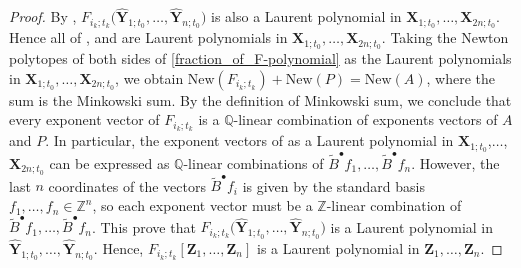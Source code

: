 \begin{proof}
 By \cite[Theorem 3.1]{BCDX2023}, $F_{i_{k};t_{k}}\bigl(\mathbf{\hat{Y}}_{1;t_{0}},\dots,\mathbf{\hat{Y}}_{n;t_{0}}\bigr)$ is also a Laurent polynomial in $\mathbf{X}_{1;t_{0}},\dots,\mathbf{X}_{2n;t_{0}}$. Hence all of ,  and  are Laurent polynomials in $\mathbf{X}_{1;t_{0}},\dots,\mathbf{X}_{2n;t_{0}}$. Taking the Newton polytopes of both sides of \eqref{fraction_of_F-polynomial} as the Laurent polynomials in $\mathbf{X}_{1;t_0},\dots, \mathbf{X}_{2n;t_0}$, we obtain
$\text{New}(F_{i_{k};t_{k}})+\text{New}(P)=\text{New}(A)$,
 where the sum is the Minkowski sum. By the definition of Minkowski sum, we conclude that every exponent vector of $F_{i_{k};t_{k}}$ is a $\mathbb{Q}$-linear combination of exponents vectors of $A$ and $P$.
 In particular, the exponent vectors of
  as a Laurent polynomial in $\mathbf{X}_{1;t_0}$,$\dots$, $\mathbf{X}_{2n;t_0}$ can be expressed as $\mathbb{Q}$-linear combinations of $\tilde{B}^{\bullet}f_{1},\dots,\tilde{B}^{\bullet}f_{n}$. However, the last $n$ coordinates of the vectors $\tilde{B}^{\bullet}f_{i}$ is given by the standard basis $f_1,\dots, f_{n}\in\mathbb{Z}^{n}$, so each exponent vector must be a $\mathbb{Z}$-linear combination of $\tilde{B}^{\bullet}f_{1},\dots,\tilde{B}^{\bullet}f_{n}$. This prove that $F_{i_{k};t_{k}}\bigl(\mathbf{\hat{Y}}_{1;t_{0}},\dots,\mathbf{\hat{Y}}_{n;t_{0}}\bigr)$ is a Laurent polynomial in $\mathbf{\hat{Y}}_{1;t_{0}},\dots,\mathbf{\hat{Y}}_{n;t_{0}}$. Hence, $F_{i_k;t_k}[\mathbf{Z}_1,\dots, \mathbf{Z}_n]$ is a Laurent polynomial in $\mathbf{Z}_{1},\dots,\mathbf{Z}_{n}$.


\end{proof}
